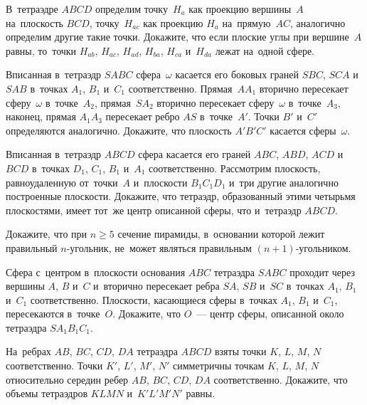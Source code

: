 \begin{problems}

\item
В~тетраэдре $ABCD$ определим
точку~$H_{a}$ как проекцию вершины~$A$ на~плоскость $BCD$,
точку~$H_{ac}$ как проекцию $H_{a}$ на~прямую~$AC$,
аналогично определим другие такие точки.
Докажите, что если плоские углы при вершине~$A$ равны, то~точки
$H_{ab}$, $H_{ac}$, $H_{ad}$, $H_{ba}$, $H_{ca}$ и~$H_{da}$ лежат на~одной
сфере.

\item
Вписанная в~тетраэдр $SABC$ сфера~$\omega$ касается его боковых граней
$SBC$, $SCA$ и~$SAB$ в~точках $A_1$, $B_1$ и~$C_1$ соответственно.
Прямая~$A A_1$ вторично пересекает сферу~$\omega$ в~точке~$A_2$,
прямая~$S A_2$ вторично пересекает сферу~$\omega$ в~точке~$A_3$, наконец,
прямая $A_1 A_3$ пересекает ребро $AS$ в~точке~$A'$.
Точки $B'$ и~$C'$ определяются аналогично.
Докажите, что плоскость $A'B'C'$ касается сферы~$\omega$.

\item
Вписанная в~тетраэдр $ABCD$ сфера касается его граней
$ABC$, $ABD$, $ACD$ и~$BCD$ в~точках $D_1$, $C_1$, $B_1$ и~$A_1$
соответственно.
Рассмотрим плоскость, равноудаленную от~точки~$A$ и~плоскости $B_1 C_1 D_1$
и~три другие аналогично построенные плоскости.
Докажите, что тетраэдр, образованный этими четырьмя плоскостями, имеет тот~же
центр описанной сферы, что и~тетраэдр $ABCD$.

\item
Докажите, что при $n \geq 5$ сечение пирамиды, в~основании которой лежит
правильный $n$-угольник, не~может являться правильным $(n + 1)$-угольником.

\item
Сфера с~центром в~плоскости основания $ABC$ тетраэдра $SABC$ проходит через
вершины $A$, $B$ и~$C$ и~вторично пересекает ребра $SA$, $SB$ и~$SC$ в~точках
$A_1$, $B_1$ и~$C_1$ соответственно.
Плоскости, касающиеся сферы в~точках $A_1$, $B_1$ и~$C_1$, пересекаются
в~точке~$O$.
Докажите, что $O$~--- центр сферы, описанной около тетраэдра $S A_1 B_1 C_1$.

\item
На~ребрах $AB$, $BC$, $CD$, $DA$ тетраэдра $ABCD$ взяты точки
$K$, $L$, $M$, $N$ соответственно.
Точки $K'$, $L'$, $M'$, $N'$ симметричны точкам $K$, $L$, $M$, $N$ относительно
середин ребер $AB$, $BC$, $CD$, $DA$ соответственно.
Докажите, что объемы тетраэдров $KLMN$ и~$K'L'M'N'$ равны.

\end{problems}

\fi

